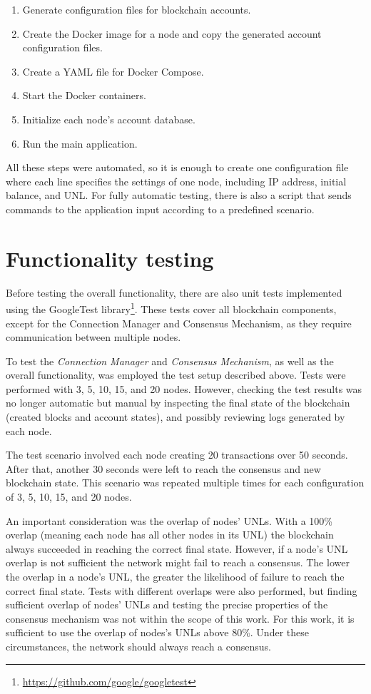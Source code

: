 \begin{enumerate}
    \item Generate configuration files for blockchain accounts.
    \item Create the Docker image for a node and copy the generated account configuration files.
    \item Create a YAML file for Docker Compose.
    \item Start the Docker containers.
    \item Initialize each node's account database.
    \item Run the main application.
\end{enumerate}

All these steps were automated, so it is enough to create one configuration file where each line specifies the settings of one node, including IP address, initial balance, and UNL. For fully automatic testing, there is also a script that sends commands to the application input according to a predefined scenario.



\section{Functionality testing}

Before testing the overall functionality, there are also unit tests implemented using the GoogleTest library\footnote{\url{https://github.com/google/googletest}}. These tests cover all blockchain components, except for the Connection Manager and Consensus Mechanism, as they require communication between multiple nodes.

To test the \emph{Connection Manager} and \emph{Consensus Mechanism}, as well as the overall functionality, was employed the test setup described above. Tests were performed with 3, 5, 10, 15, and 20 nodes. However, checking the test results was no longer automatic but manual by inspecting the final state of the blockchain (created blocks and account states), and possibly reviewing logs generated by each node.

The test scenario involved each node creating 20 transactions over 50 seconds. After that, another 30 seconds were left to reach the consensus and new blockchain state. This scenario was repeated multiple times for each configuration of 3, 5, 10, 15, and 20 nodes.

An important consideration was the overlap of nodes' UNLs. With a 100\% overlap (meaning each node has all other nodes in its UNL) the blockchain always succeeded in reaching the correct final state. However, if a node's UNL overlap is not sufficient the network might fail to reach a consensus. The lower the overlap in a node's UNL, the greater the likelihood of failure to reach the correct final state. Tests with different overlaps were also performed, but finding sufficient overlap of nodes' UNLs and testing the precise properties of the consensus mechanism was not within the scope of this work. For this work, it is sufficient to use the overlap of nodes's UNLs above 80\%. Under these circumstances, the network should always reach a consensus.


